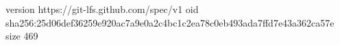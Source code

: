 version https://git-lfs.github.com/spec/v1
oid sha256:25d06def36259e920ac7a9e0a2c4bc1c2ea78c0eb493ada7ffd7e43a362ca57e
size 469
